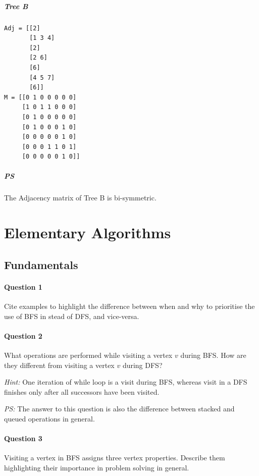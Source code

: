 \documentclass[11pt]{article}
\begin{document}
\subparagraph*{Tree B}
\label{sec:org5d0634f}
\begin{verbatim}
Adj = [[2]
       [1 3 4]
       [2]
       [2 6]
       [6]
       [4 5 7]
       [6]]
M = [[0 1 0 0 0 0 0]
     [1 0 1 1 0 0 0]
     [0 1 0 0 0 0 0]
     [0 1 0 0 0 1 0]
     [0 0 0 0 0 1 0]
     [0 0 0 1 1 0 1]
     [0 0 0 0 0 1 0]]
\end{verbatim}

\subparagraph*{PS}
\label{sec:org69d9c2a}
The Adjacency matrix of Tree B is bi-symmetric.

\section{Elementary Algorithms}
\label{sec:org845571d}

\subsection{Fundamentals}
\label{sec:orgf27a83c}

\paragraph*{Question 1}
\label{sec:orgb90c209}

Cite examples to highlight the difference between when
and why to prioritise the use of BFS in stead of DFS,
and vice-versa.

\paragraph*{Question 2}
\label{sec:org148745a}

What operations are performed while visiting a vertex
\(v\) during BFS.  How are they different from visiting a
vertex \(v\) during DFS?

\emph{Hint:} One iteration of while loop is a visit during
BFS, whereas visit in a DFS finishes only after all
successors have been visited.

\emph{PS:} The answer to this question is also the
difference between stacked and queued operations in
general.

\paragraph*{Question 3}
\label{sec:org70450cb}

Visiting a vertex in BFS assigns three vertex
properties.  Describe them highlighting their
importance in problem solving in general.
\end{document}
